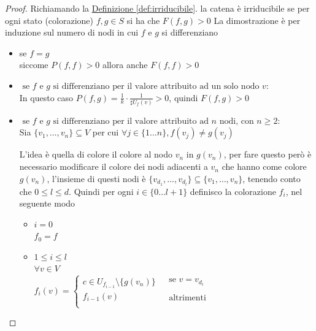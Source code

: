 \documentclass{article}
\begin{document}
\begin{proof}
Richiamando la \hyperref[def:irriducibile]{Definizione \ref*{def:irriducibile}}. la catena è irriducibile se per ogni stato (colorazione) $f, g \in S$ si ha che $F(f,g) > 0$
La dimostrazione è per induzione sul numero di nodi in cui $f$ e $g$ si differenziano

 \begin{itemize}
        \item{se $f =g$} \\ 
            siccome $P(f,f) > 0$ allora anche $F(f,f) > 0$
        \item{$\text { se } f \text { e } g  \text { si differenziano per il valore attribuito ad un solo nodo } v $}: \\ 
            In questo caso $P(f,g) = \frac{1}{k} \cdot \frac{1}{\sharp U_{f}(v)} > 0$, quindi $F(f,g) > 0$
        \item{$\text { se } f \text { e } g \text { si differenziano per il valore attribuito ad } n \text { nodi, con } n\geq 2$}: \\
        Sia $\{v_1, \dots, v_n\} \subseteq V$ per cui $\forall j \in \{1 \dots n\}, f(v_j) \neq g(v_j)$

        L'idea è quella di colore il colore  al nodo $v_n$ in $g(v_n)$, per fare questo però è necessario modificare il colore dei nodi adiacenti a $v_n$ che hanno come colore $g(v_n)$, l'insieme di questi nodi è  $\{v_{d_1}, \dots, v_{d_l}\} \subseteq \{v_1, \dots, v_n\}$, tenendo conto che $0 \leq l \leq d$.
        Quindi per ogni $i \in \{0 \dots l + 1\}$ definisco la colorazione $f_i$, nel seguente modo
        \begin{itemize}
            \item $i = 0$ \\ 
            $f_0 = f$ \vspace{14pt}

            \item $1 \leq i \leq l$ \\
            $\forall v \in V$ \\
            $f_i(v) = \left\{\begin{array}{ll}
                c \in U_{f_{i-1}} \setminus \{g(v_n) \} & \begin{array}{c} \text { se } v = v_{d_i}  \end{array}\\
                f_{i-1}(v) & \begin{array}{c} \text { altrimenti } \end{array}\\
        \end{array}\right. $ \\
            

\end{itemize}
\end{itemize}
\end{proof}
\end{document}
